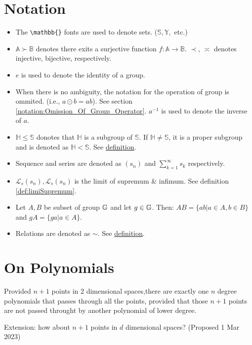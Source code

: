 \documentclass[../note.tex]{subfiles}
\begin{document}
\renewcommand{\thechapter}{\Roman{chapter}}
\chapter{Notation}
\begin{itemize}
	\item The \verb|\mathbb{}| fonts are used to denote sets. ($\mathbb{S}, \mathbb{Y},$ etc.)
	\item $\mathbb{A} \succ \mathbb{B}$ denotes there exits a surjective function $f:\mathbb{A}\rightarrow \mathbb{B}$. $\prec$, $\asymp$ denotes injective, bijective, respectively.
	\item $e$ is used to denote the identity of a group.
	\item When there is no ambiguity, the notation for the operation of group is ommited. (i.e., $a \odot b = ab$). See section \ref{notation:Omission_Of_Group_Operator}.
		$a^{-1}$ is used to denote the inverse of $a$.
	\item $\mathbb{H}\leq \mathbb{S}$ donotes that $\mathbb{H}$ is a subgroup of $\mathbb{S}$. If $\mathbb{H}\neq \mathbb{S}$, it is a proper subgroup and is denoted as $\mathbb{H}<\mathbb{S}$. See \hyperlink{def:subgroup}{definition}.
	\item Sequence and series are denoted as $(s_n)$ and $\sum^{\infty}_{k=1}s_k$ respectively.
	\item $\mathcal{L}_s(s_n), \mathcal{L}_s(s_n)$ is the limit of supremum \& infimum. See definition \ref{def:limiSupremum}.
	\item Let $A, B$ be subset of group $\mathbb{G}$ and let $g \in \mathbb{G}$. Then: $AB = \{ab|a\in A, b\in B\}$ and $gA = \{ga|a\in A\}$. 
	\item Relations are denoted as $\sim$. See \hyperlink{def:relation}{definition}.
\end{itemize}

\chapter{On Polynomials}
\label{appendix:hypotheises}
\begin{hypothesis}
	Provided $n+1$ points in 2 dimensional spaces,there are exactly one $n$ degree polynomials that passes through all the points, provided that those $n+1$ points are not passed throught by another polynomial of lower degree.

	Extension: how about $n+1$ points in $d$ dimensional spaces? (Proposed 1 Mar 2023)
\end{hypothesis}
\end{document}
